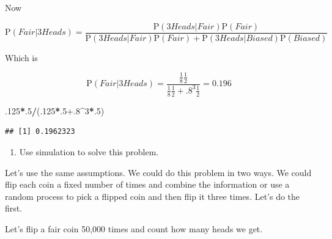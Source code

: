\documentclass[
]{book}
\newenvironment{Shaded}{\begin{snugshade}}{\end{snugshade}}
\newcommand{\DataTypeTok}[1]{\textcolor[rgb]{0.13,0.29,0.53}{#1}}
\newcommand{\DecValTok}[1]{\textcolor[rgb]{0.00,0.00,0.81}{#1}}
\newcommand{\FloatTok}[1]{\textcolor[rgb]{0.00,0.00,0.81}{#1}}
\newcommand{\KeywordTok}[1]{\textcolor[rgb]{0.13,0.29,0.53}{\textbf{#1}}}
\newcommand{\NormalTok}[1]{#1}
\newcommand{\OperatorTok}[1]{\textcolor[rgb]{0.81,0.36,0.00}{\textbf{#1}}}
\newcommand{\StringTok}[1]{\textcolor[rgb]{0.31,0.60,0.02}{#1}}
\providecommand{\tightlist}{%
  \setlength{\itemsep}{0pt}\setlength{\parskip}{0pt}}
\begin{document}
Now

\[
\mbox{P}(Fair | 3 Heads) = \frac{\mbox{P}(3 Heads | Fair)\mbox{P}(Fair)}{\mbox{P}(3 Heads | Fair)\mbox{P}(Fair)+\mbox{P}(3 Heads| Biased)\mbox{P}(Biased)}
\]

Which is

\[
\mbox{P}(Fair | 3 Heads) =  \frac{\frac{1}{8}\frac{1}{2}}{\frac{1}{8}\frac{1}{2}+.8^{3}\frac{1}{2}} = 0.196
\]

\begin{Shaded}
\begin{Highlighting}[]
\FloatTok{.125}\OperatorTok{*}\NormalTok{.}\DecValTok{5}\OperatorTok{/}\NormalTok{(.}\DecValTok{125}\OperatorTok{*}\NormalTok{.}\DecValTok{5}\FloatTok{+.8}\OperatorTok{^}\DecValTok{3}\OperatorTok{*}\NormalTok{.}\DecValTok{5}\NormalTok{)}
\end{Highlighting}
\end{Shaded}

\begin{verbatim}
## [1] 0.1962323
\end{verbatim}

\begin{enumerate}
\def\labelenumi{\alph{enumi}.}
\setcounter{enumi}{1}
\tightlist
\item
  Use simulation to solve this problem.
\end{enumerate}

Let's use the same assumptions. We could do this problem in two ways. We could flip each coin a fixed number of times and combine the information or use a random process to pick a flipped coin and then flip it three times. Let's do the first.

Let's flip a fair coin 50,000 times and count how many heads we get.

\begin{Shaded}
\end{Shaded}
\end{document}
